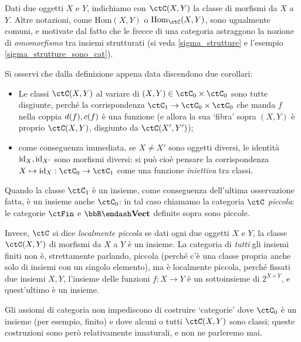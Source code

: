 \begin{notation}
Dati due oggetti $X$ e $Y$, indichiamo con $\Hom{\ctC}(X,Y)$ la classe di morfismi da $X$ a $Y$. Altre notazioni, come $\mathrm{Hom}(X,Y)$ o $\mathrm{Hom}_\ctC(X,Y)$, sono ugualmente comuni, e motivate dal fatto che le frecce di una categoria astraggono la nozione di \emph{omomorfismo} tra insiemi strutturati (si veda \autoref{sigma_strutture} e l'esempio \autoref{sigma_strutture_sono_cat}).
\end{notation}
\begin{remark}
    Si osservi che dalla definizione appena data discendono due corollari:
    \begin{itemize}
        \item Le classi $\Hom{\ctC}(X,Y)$ al variare di $(X,Y)\in\ctC_0\times\ctC_0$ sono tutte disgiunte, perché la corrispondenza $\ctC_1 \to \ctC_0\times\ctC_0$ che manda $f$ nella coppia $d(f),c(f)$ è una funzione (e allora la sua `fibra' sopra $(X,Y)$ è proprio $\Hom{\ctC}(X,Y)$, disgiunto da $\Hom{\ctC}(X',Y')$);
        \item come conseguenza immediata, se $X\ne X'$ sono oggetti diversi, le identità $\mathrm{id}_X,\mathrm{id}_{X'}$ sono morfismi diversi: si può cioè pensare la corrispondenza $X\mapsto \id_X : \ctC_0\to\ctC_1$ come una funzione \emph{iniettiva} tra classi.
    \end{itemize}
\end{remark}
\begin{definition}
    Quando la classe $\ctC_1$ è un insieme, come conseguenza dell'ultima osservazione fatta, è un insieme anche $\ctC_0$: in tal caso chiamamo la categoria $\ctC$ \emph{piccola}: le categorie $\ctFin$ e $\bbR\emdash\ctVect$ definite sopra sono piccole.

    Invece, $\ctC$ si dice \emph{localmente piccola} se dati ogni due oggetti $X$ e $Y$, la classe $\Hom{\ctC}(X,Y)$ di morfismi da $X$ a $Y$ è un insieme. La categoria di \emph{tutti} gli insiemi finiti non è, strettamente parlando, piccola (perché c'è una classe propria anche solo di insiemi con un singolo elemento), ma è localmente piccola, perché fissati due insiemi $X,Y$, l'insieme delle funzioni $f : X\to Y$ è un sottoinsieme di $2^{X\times Y}$, e quest'ultimo è un insieme.
\end{definition}
\begin{remark}
    Gli assiomi di categoria non impediscono di costruire `categorie' dove $\ctC_0$ è un insieme (per esempio, finito) e dove alcuni o tutti $\Hom{\ctC}(X,Y)$ sono classi; queste costruzioni sono però relativamente innaturali, e non ne parleremo mai.
\end{remark}
